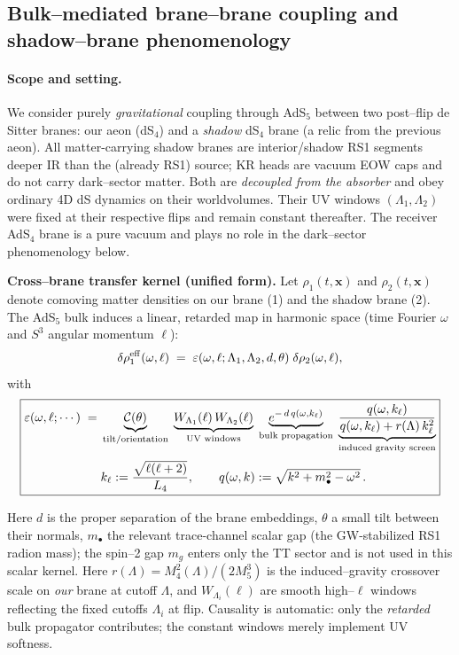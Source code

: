\documentclass[10pt]{article}
\theoremstyle{definition}
\theoremstyle{plain}
\begin{document}
\subsection{Bulk–mediated brane–brane coupling and shadow–brane phenomenology}
\label{subsec:shadow-brane}

\paragraph{Scope and setting.}\label{par:uom-main-066}
We consider purely \emph{gravitational} coupling through AdS$_5$ between two post–flip
de Sitter branes: our aeon (dS$_4$) and a \emph{shadow} dS$_4$ brane (a relic from the
previous aeon). All matter-carrying shadow branes are interior/shadow RS1 segments deeper IR
than the (already RS1) source; KR heads are vacuum EOW caps and do not carry dark--sector matter.
Both are \emph{decoupled from the absorber} and obey ordinary 4D dS dynamics on their worldvolumes.
Their UV windows $(\Lambda_1,\Lambda_2)$ were fixed at their respective flips and remain constant thereafter.
The receiver AdS$_4$ brane is a pure vacuum and plays no role in the dark--sector phenomenology below.

\medskip
\noindent\textbf{Cross–brane transfer kernel (unified form).}
Let $\rho_1(t,\mathbf x)$ and $\rho_2(t,\mathbf x)$ denote comoving matter densities on
our brane (1) and the shadow brane (2). The AdS$_5$ bulk induces a linear, retarded
map in harmonic space (time Fourier $\omega$ and $S^3$ angular momentum $\ell$):
\[
\delta\rho^{\rm eff}_1(\omega,\ell)\;=\;\varepsilon(\omega,\ell;\Lambda_1,\Lambda_2,d,\theta)\;
\delta\rho_2(\omega,\ell),
\]
with \vspace{-0.25em}
\begin{equation}
\label{eq:eps-factorization}
\boxed{%
\begin{aligned}
\varepsilon(\omega,\ell;\cdots)\;=\;&
\underbrace{\mathcal C(\theta)}_{\text{tilt/orientation}}\;
\underbrace{W_{\Lambda_1}(\ell)\,W_{\Lambda_2}(\ell)}_{\text{UV windows}}\;
\underbrace{e^{-\,d\,q(\omega,k_\ell)}}_{\text{bulk propagation}}\;
\underbrace{\frac{q(\omega,k_\ell)}{q(\omega,k_\ell)+r(\Lambda)\,k_\ell^2}}_{\text{induced gravity screen}}
\\[2pt]
&k_\ell:=\frac{\sqrt{\ell(\ell+2)}}{L_4},\qquad
q(\omega,k):=\sqrt{k^2+m_\bullet^2-\omega^2}\,.
\end{aligned}}
\end{equation}

Here $d$ is the proper separation of the brane embeddings, $\theta$ a small tilt
between their normals, $m_\bullet$ the relevant trace-channel scalar gap (the GW-stabilized RS1 radion mass);
the spin--2 gap $m_g$ enters only the TT sector and is not used in this scalar kernel. Here
$r(\Lambda)=M_4^2(\Lambda)/(2M_5^3)$ is the induced--gravity crossover
scale on \emph{our} brane at cutoff $\Lambda$, and $W_{\Lambda_i}(\ell)$ are smooth high--$\ell$
windows reflecting the fixed cutoffs $\Lambda_i$ at flip. Causality is automatic:
only the \emph{retarded} bulk propagator contributes; the constant windows merely
implement UV softness.
\end{document}
